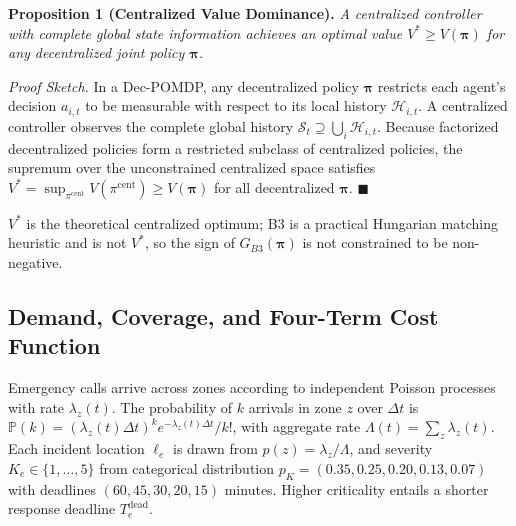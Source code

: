 \documentclass{article}
\begin{document}
\noindent\textbf{Proposition 1 (Centralized Value Dominance).} \textit{A centralized controller with complete global state information achieves an optimal value $V^* \ge V(\boldsymbol{\pi})$ for any decentralized joint policy $\boldsymbol{\pi}$.}

\textit{Proof Sketch.} In a Dec-POMDP, any decentralized policy $\boldsymbol{\pi}$ restricts each agent's decision $a_{i,t}$ to be measurable with respect to its local history $\mathcal{H}_{i,t}$. A centralized controller observes the complete global history $\mathcal{S}_t \supseteq \bigcup_{i} \mathcal{H}_{i,t}$. Because factorized decentralized policies form a restricted subclass of centralized policies, the supremum over the unconstrained centralized space satisfies $V^* = \sup_{\pi^{\mathrm{cent}}} V(\pi^{\mathrm{cent}}) \ge V(\boldsymbol{\pi})$ for all decentralized $\boldsymbol{\pi}$. \hfill $\blacksquare$

\noindent $V^*$ is the theoretical centralized optimum; B3 is a practical Hungarian matching heuristic and is not $V^*$, so the sign of $G_{B3}(\boldsymbol{\pi})$ is not constrained to be non-negative.

\subsection{Demand, Coverage, and Four-Term Cost Function}
Emergency calls arrive across zones according to independent Poisson processes with rate $\lambda_z(t)$. The probability of $k$ arrivals in zone $z$ over $\Delta t$ is $\mathbb{P}(k) = (\lambda_z(t)\Delta t)^k e^{-\lambda_z(t)\Delta t} / k!$, with aggregate rate $\Lambda(t) = \sum_{z} \lambda_z(t)$. Each incident location $\ell_e$ is drawn from $p(z) = \lambda_z / \Lambda$, and severity $K_e \in \{1, \ldots, 5\}$ from categorical distribution $p_K = (0.35, 0.25, 0.20, 0.13, 0.07)$ with deadlines $(60, 45, 30, 20, 15)$ minutes. Higher criticality entails a shorter response deadline $T_e^{\mathrm{dead}}$.
\end{document}
